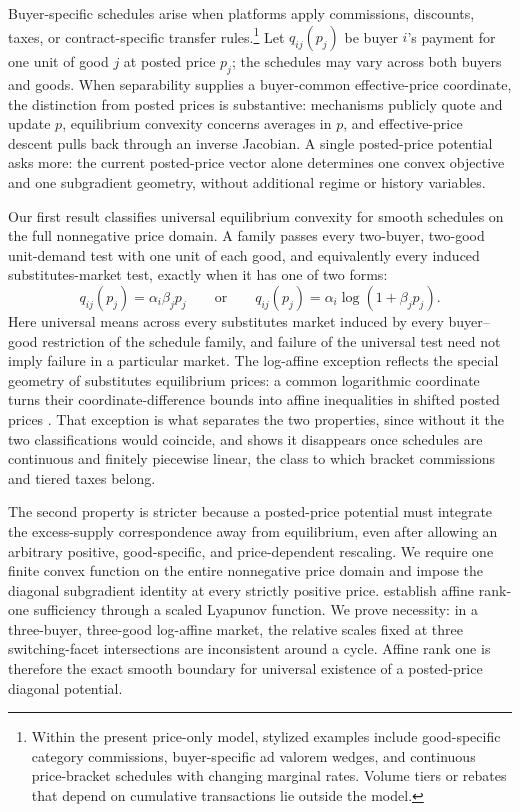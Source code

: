 Buyer-specific schedules arise when platforms apply commissions, discounts, taxes, or contract-specific transfer rules.\footnote{Within the present price-only model, stylized examples include good-specific category commissions, buyer-specific ad valorem wedges, and continuous price-bracket schedules with changing marginal rates. Volume tiers or rebates that depend on cumulative transactions lie outside the model.} Let $q_{ij}(p_j)$ be buyer $i$'s payment for one unit of good $j$ at posted price $p_j$; the schedules may vary across both buyers and goods. When separability supplies a buyer-common effective-price coordinate, the distinction from posted prices is substantive: mechanisms publicly quote and update $p$, equilibrium convexity concerns averages in $p$, and effective-price descent pulls back through an inverse Jacobian. A single posted-price potential asks more: the current posted-price vector alone determines one convex objective and one subgradient geometry, without additional regime or history variables.

Our first result classifies universal equilibrium convexity for smooth schedules on the full nonnegative price domain. A family passes every two-buyer, two-good unit-demand test with one unit of each good, and equivalently every induced substitutes-market test, exactly when it has one of two forms:
\[
q_{ij}(p_j)=\alpha_i\beta_jp_j
\qquad\text{or}\qquad
q_{ij}(p_j)=\alpha_i\log(1+\beta_jp_j).
\]
Here universal means across every substitutes market induced by every buyer--good restriction of the schedule family, and failure of the universal test need not imply failure in a particular market. The log-affine exception reflects the special geometry of substitutes equilibrium prices: a common logarithmic coordinate turns their coordinate-difference bounds into affine inequalities in shifted posted prices \citep{murota2003,moriguchimurota2023}. That exception is what separates the two properties, since without it the two classifications would coincide, and  shows it disappears once schedules are continuous and finitely piecewise linear, the class to which bracket commissions and tiered taxes belong.

The second property is stricter because a posted-price potential must integrate the excess-supply correspondence away from equilibrium, even after allowing an arbitrary positive, good-specific, and price-dependent rescaling. We require one finite convex function on the entire nonnegative price domain and impose the diagonal subgradient identity at every strictly positive price. \citet{okisato2026} establish affine rank-one sufficiency through a scaled Lyapunov function. We prove necessity: in a three-buyer, three-good log-affine market, the relative scales fixed at three switching-facet intersections are inconsistent around a cycle. Affine rank one is therefore the exact smooth boundary for universal existence of a posted-price diagonal potential.

